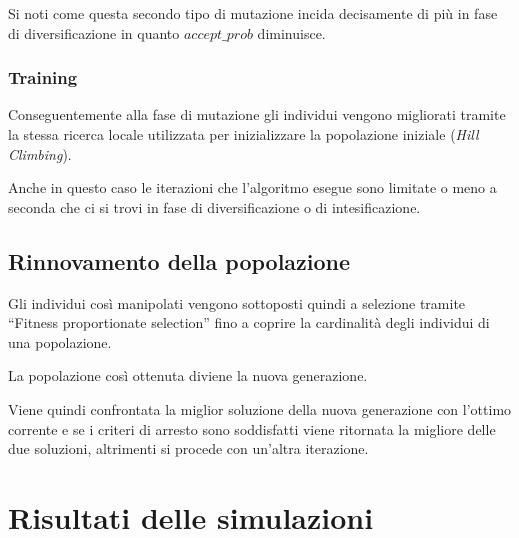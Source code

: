 \documentclass[a4paper]{article}
\begin{document}
                Si noti come questa secondo tipo di mutazione incida decisamente di pi\`u in fase di diversificazione in quanto $accept\_prob$ diminuisce.

            \subsubsection{Training}
                Conseguentemente alla fase di mutazione gli individui vengono migliorati tramite la stessa ricerca locale utilizzata per inizializzare
                la popolazione iniziale (\emph{Hill Climbing}).

                Anche in questo caso le iterazioni che l'algoritmo esegue sono limitate o meno a seconda che ci si trovi in fase di diversificazione o di intesificazione.

        \subsection{Rinnovamento della popolazione}
            Gli individui cos\`i manipolati vengono sottoposti quindi a selezione tramite ``Fitness proportionate selection'' fino a coprire la
            cardinalit\`a degli individui di una popolazione.

            La popolazione cos\`i ottenuta diviene la nuova generazione.
            
            Viene quindi confrontata la miglior soluzione della nuova generazione con l'ottimo corrente e se i criteri di arresto sono soddisfatti viene ritornata la migliore delle due soluzioni,
            altrimenti si procede con un'altra iterazione.
\newpage
    \section{Risultati delle simulazioni}
        
\end{document}
